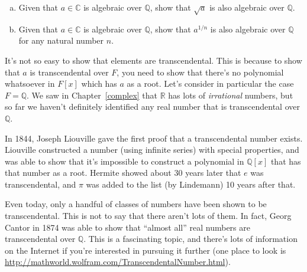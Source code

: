 \begin{exercise}{}
\begin {enumerate}[(a)]
\item
Given that $a \in \mathbb{C}$ is algebraic over $\mathbb{Q}$, show that $\sqrt{a}$ is also algebraic over $\mathbb{Q}$.
\item
Given that $a \in \mathbb{C}$ is algebraic over $\mathbb{Q}$, show that $a^{1/n}$ is also algebraic over $\mathbb{Q}$ for any natural number $n$.
\end{enumerate}
\end{exercise}


\begin{rem}\label{remark:poly:transcendental}
It's not so easy to show that elements are transcendental. This is because to show that $a$ is transcendental over $F$, you need to show that there's no polynomial whatsoever in $F[x]$  which has $a$ as a root. Let's consider in particular the case $F = \mathbb{Q}$. We saw in Chapter~\ref{complex} that $\mathbb{R}$ has lots of \emph{irrational} numbers, but so far we haven't definitely identified any real number that is transcendental over $\mathbb{Q}$. 

In 1844, Joseph Liouville gave the first proof that a transcendental number exists.  Liouville constructed a number (using infinite series) with special properties, and was able to show that it's impossible to construct a polynomial in $\mathbb{Q}[x]$ that has that number as a root. Hermite showed about 30 years later that $e$ was transcendental, and $\pi$ was added to the list (by Lindemann) 10 years after that. 

Even today, only  a handful of classes of numbers have been shown to be transcendental. This is not to say that there aren't lots of them. In fact, Georg Cantor in 1874 was able to show that ``almost all'' real numbers are transcendental over $\mathbb{Q}$. This is a fascinating topic, and there's lots of information on the Internet if you're interested in pursuing it further (one place to look is 
\url{http://mathworld.wolfram.com/TranscendentalNumber.html}).
\end{rem}

